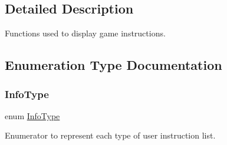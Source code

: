 \subsection{Detailed Description}
Functions used to display game instructions. 

\subsection{Enumeration Type Documentation}
\mbox{\label{group__game__info_ga4fab2721054fd66cc89f138fd029fd1f}} 
\subsubsection{\texorpdfstring{Info\+Type}{InfoType}}
{\footnotesize\ttfamily enum \mbox{\hyperlink{group__game__info_ga4fab2721054fd66cc89f138fd029fd1f}{Info\+Type}}}



Enumerator to represent each type of user instruction list. 

